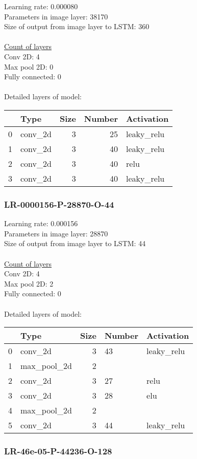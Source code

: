 Learning rate: 0.000080
\\Parameters in image layer: 38170
\\Size of output from image layer to LSTM: 360
\\\\\underline{Count of layers} 
\\Conv 2D:           4\\Max pool 2D:      0\\Fully connected:  0
\\\\Detailed layers of model: \\\begin{tabular}{rlrrl}
\hline
    & Type    &   Size &   Number & Activation   \\
\hline
  0 & conv\_2d &      3 &       25 & leaky\_relu   \\
  1 & conv\_2d &      3 &       40 & leaky\_relu   \\
  2 & conv\_2d &      3 &       40 & relu         \\
  3 & conv\_2d &      3 &       40 & leaky\_relu   \\
\hline
\end{tabular}\subsubsection*{LR-0000156-P-28870-O-44}
Learning rate: 0.000156
\\Parameters in image layer: 28870
\\Size of output from image layer to LSTM: 44
\\\\\underline{Count of layers} 
\\Conv 2D:           4\\Max pool 2D:      2\\Fully connected:  0
\\\\Detailed layers of model: \\\begin{tabular}{rlrll}
\hline
    & Type        &   Size & Number   & Activation   \\
\hline
  0 & conv\_2d     &      3 & 43       & leaky\_relu   \\
  1 & max\_pool\_2d &      2 &          &              \\
  2 & conv\_2d     &      3 & 27       & relu         \\
  3 & conv\_2d     &      3 & 28       & elu          \\
  4 & max\_pool\_2d &      2 &          &              \\
  5 & conv\_2d     &      3 & 44       & leaky\_relu   \\
\hline
\end{tabular}\subsubsection*{LR-46e-05-P-44236-O-128}
